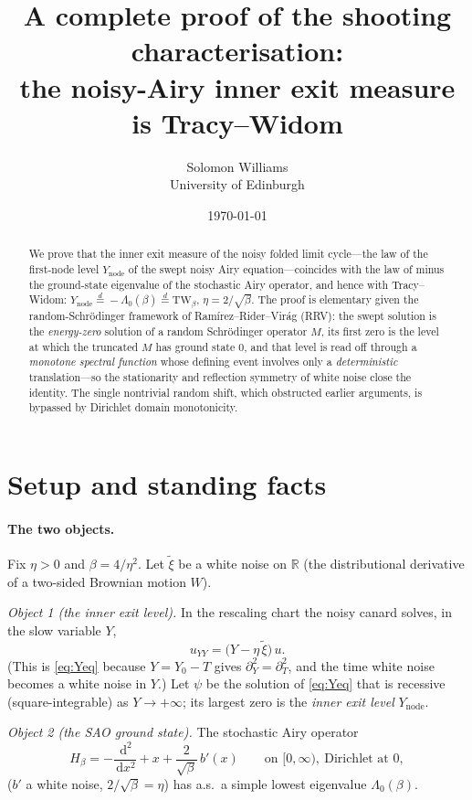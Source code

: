 \documentclass[11pt]{article}
\title{\textbf{A complete proof of the shooting characterisation:\\
the noisy-Airy inner exit measure is Tracy--Widom}}
\author{Solomon Williams \\ \small University of Edinburgh}
\date{\today}
\theoremstyle{definition}
\theoremstyle{remark}
\newcommand{\dd}{\,\mathrm{d}}
\newcommand{\Ynode}{Y_{\mathrm{node}}}
\newcommand{\TW}{\mathrm{TW}}
\newcommand{\R}{\mathbb{R}}
\newcommand{\eqd}{\stackrel{d}{=}}
\newcommand{\xit}{\widetilde{\xi}}
\begin{document}
\maketitle

\begin{abstract}
\noindent
We prove that the inner exit measure of the noisy folded limit cycle---the law of the
first-node level $\Ynode$ of the swept noisy Airy equation---coincides with the law of
minus the ground-state eigenvalue of the stochastic Airy operator, and hence with
Tracy--Widom: $\Ynode\eqd-\Lambda_0(\beta)\eqd\TW_\beta$, $\eta=2/\sqrt\beta$. The proof
is elementary given the random-Schr\"odinger framework of Ram\'irez--Rider--Vir\'ag
(RRV): the swept solution is the \emph{energy-zero} solution of a random Schr\"odinger
operator $M$, its first zero is the level at which the truncated $M$ has ground state
$0$, and that level is read off through a \emph{monotone spectral function} whose
defining event involves only a \emph{deterministic} translation---so the stationarity
and reflection symmetry of white noise close the identity. The single nontrivial random
shift, which obstructed earlier arguments, is bypassed by Dirichlet domain
monotonicity.
\end{abstract}

\section{Setup and standing facts}

\paragraph{The two objects.} Fix $\eta>0$ and $\beta=4/\eta^2$. Let $\xit$ be a white
noise on $\R$ (the distributional derivative of a two-sided Brownian motion $W$).

\emph{Object 1 (the inner exit level).} In the rescaling chart the noisy canard solves,
in the slow variable $Y$,
\begin{equation}\label{eq:Yeq}
  u_{YY}=\bigl(Y-\eta\,\xit\bigr)\,u .
\end{equation}
(This is \eqref{eq:Yeq} because $Y=Y_0-T$ gives $\partial_Y^2=\partial_T^2$, and the
time white noise becomes a white noise in $Y$.) Let $\psi$ be the solution of
\eqref{eq:Yeq} that is recessive (square-integrable) as $Y\to+\infty$; its largest zero
is the \emph{inner exit level} $\Ynode$.

\emph{Object 2 (the SAO ground state).} The stochastic Airy operator
\begin{equation}\label{eq:SAO}
  H_\beta=-\frac{\dd^2}{\dd x^2}+x+\frac{2}{\sqrt\beta}\,b'(x)
  \qquad\text{on }[0,\infty),\ \text{Dirichlet at }0,
\end{equation}
($b'$ a white noise, $2/\sqrt\beta=\eta$) has a.s.\ a simple lowest eigenvalue
$\Lambda_0(\beta)$.
\end{document}
